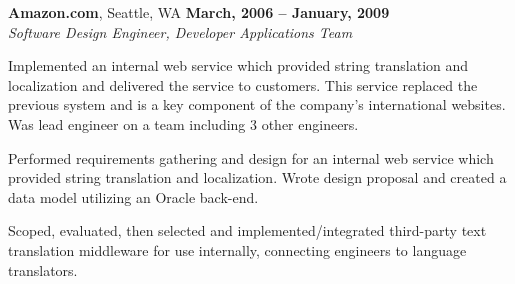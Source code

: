 \documentclass[margin,line]{resume}
\begin{document}
\begin{resume}
    {\bf Amazon.com}, Seattle, WA   \hfill {\bf March, 2006 -- January, 2009}
    \vspace{1mm} \\ \vspace{1mm}
    {\sl Software Design Engineer, Developer Applications Team} %
    \begin{list2}
        \vspace*{1mm}
        \item
          Implemented an internal web service which provided string translation and
          localization and delivered the service to customers.  This service replaced
          the previous system and is a key component of the company's international
          websites.  Was lead engineer on a team including 3 other engineers.
        \item
          Performed requirements gathering and design for an internal web service which
          provided string translation and localization.  Wrote design proposal and
          created a data model utilizing an Oracle back-end.
        \item
          Scoped, evaluated, then selected and implemented/integrated third-party text
          translation middleware for use internally, connecting engineers to language
          translators.
    \end{list2}


\end{resume}
\end{document}
